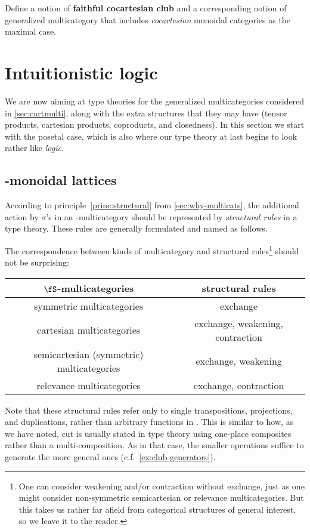 \begin{ex}\label{ex:cocartesian-clubs}
  Define a notion of \textbf{faithful cocartesian club} and a corresponding notion of generalized multicategory that includes \emph{cocartesian} monoidal categories as the maximal case.
\end{ex}


\section{Intuitionistic logic}
\label{sec:logic}

We are now aiming at type theories for the generalized multicategories considered in \cref{sec:cartmulti}, along with the extra structures that they may have (tensor products, cartesian products, coproducts, and closedness).
In this section we start with the posetal case, which is also where our type theory at last begins to look rather like \emph{logic}.

\subsection{\fS-monoidal lattices}
\label{sec:monoidal-lattices}

According to principle~\eqref{princ:structural} from \cref{sec:why-multicats}, the additional action by $\sigma$'s in an \fS-multicategory should be represented by \emph{structural rules} in a type theory.
These rules are generally formulated and named as follows.
The correspondence between kinds of multicategory and structural rules\footnote{One can consider weakening and/or contraction without exchange, just as one might consider non-symmetric semicartesian or relevance multicategories.
  But this takes us rather far afield from categorical structures of general interest, so we leave it to the reader.} should not be surprising:
\begin{center}
\begin{tabular}{c|c}
  $\fS$-multicategories & structural rules\\\hline
  {symmetric multicategories} & exchange\\
  {cartesian multicategories} & exchange, weakening, contraction\\
  {semicartesian (symmetric) multicategories} & exchange, weakening\\
  {relevance multicategories} & exchange, contraction
\end{tabular}
\end{center}
Note that these structural rules refer only to single transpositions, projections, and duplications, rather than arbitrary functions in \fS.
This is similar to how, as we have noted, cut is usually stated in type theory using one-place composites rather than a multi-composition.
As in that case, the smaller operations suffice to generate the more general ones (c.f.\ \cref{ex:club-generators}).

